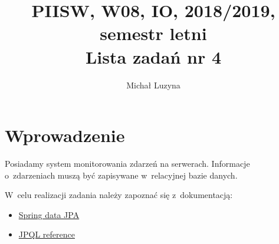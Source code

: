 \documentclass[12pt]{article}
\title{PIISW, W08, IO, 2018/2019, semestr letni\\Lista zadań nr 4}
\author{Michał Luzyna}
\begin{document}
    \maketitle

    \section*{Wprowadzenie}
        Posiadamy system monitorowania zdarzeń na serwerach. Informacje o~zdarzeniach muszą być zapisywane w~relacyjnej bazie danych.

        W~celu realizacji zadania należy zapoznać się z~dokumentacją:
        \begin{itemize}
            \item \href{https://docs.spring.io/spring-data/jpa/docs/current/reference/html/}{Spring data JPA}
            \item \href{https://docs.oracle.com/javaee/6/tutorial/doc/bnbuf.html}{JPQL reference}
        \end{itemize}
\end{document}
